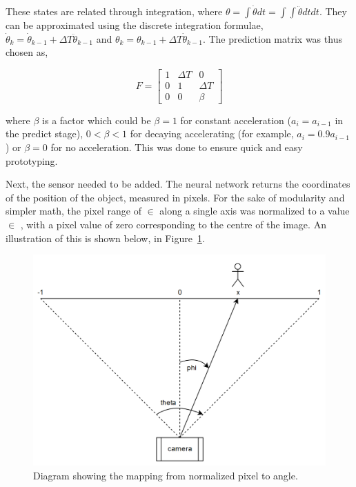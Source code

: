 These states are related through integration, where $\theta = \int{\dot{\theta} dt} = \int{\int{\ddot{\theta} dt}dt}$. They can be approximated using the discrete integration formulae, $\dot{\theta}_k = \dot{\theta}_{k-1} + \Delta T \ddot{\theta}_{k-1}$ and $\theta_k = \theta_{k-1} + \Delta T \dot{\theta}_{k-1}$. The prediction matrix was thus chosen as,

\[ F = \begin{bmatrix} 1 & \Delta T & 0 \\
                       0 & 1 & \Delta T \\
					   0 & 0 & \beta
		\end{bmatrix} \]

where $\beta$ is a factor which could be $\beta = 1$ for constant acceleration ($a_i = a_{i-1}$ in the predict stage), $0 < \beta < 1$ for decaying accelerating (for example, $a_i = 0.9 a_{i-1}$) or $\beta = 0$ for no acceleration. This was done to ensure quick and easy prototyping.

Next, the sensor needed to be added. The neural network returns the coordinates of the position of the object, measured in pixels. For the sake of modularity and simpler math, the pixel range of  $\in$ \pyth{[0, 299]} along a single axis was normalized to a value  $\in$ \pyth{[-1, 1]}, with a pixel value of zero corresponding to the centre of the image. An illustration of this is shown below, in Figure~\ref{fig:pixel_to_angle}.

\begin{figure}[h!]
  \centering
  \includegraphics[width=\textwidth]{methodology/pixel_to_angle2}
  \caption{\label{fig:pixel_to_angle} Diagram showing the mapping from normalized pixel to angle.}
\end{figure}

